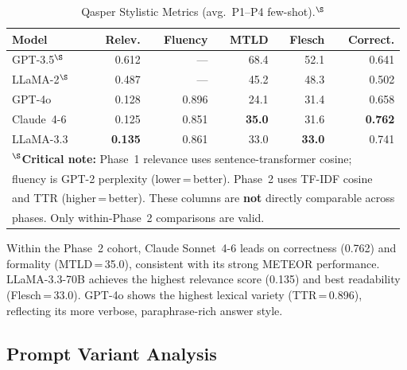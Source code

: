 \documentclass[sigconf,nonacm]{acmart}
\begin{document}
\begin{table}[t]
\caption{Qasper Stylistic Metrics (avg.\ P1--P4 few-shot).$^{\S}$}
\label{tab:qasper-style}
\centering\small
\setlength{\tabcolsep}{3.5pt}
\begin{tabular}{lrrrrr}
\toprule
\textbf{Model} & \textbf{Relev.}
  & \textbf{Fluency} & \textbf{MTLD} & \textbf{Flesch} & \textbf{Correct.} \\
\midrule
GPT-3.5$^{\S}$ & 0.612 & --- & 68.4 & 52.1 & 0.641 \\
LLaMA-2$^{\S}$ & 0.487 & --- & 45.2 & 48.3 & 0.502 \\
\midrule
GPT-4o      & 0.128 & 0.896 & 24.1 & 31.4 & 0.658 \\
Claude~4-6  & 0.125 & 0.851 & \textbf{35.0} & 31.6 & \textbf{0.762} \\
LLaMA-3.3   & \textbf{0.135} & 0.861 & 33.0 & \textbf{33.0} & 0.741 \\
\bottomrule
\multicolumn{6}{l}{\footnotesize $^{\S}$\textbf{Critical note:} Phase~1
  relevance uses sentence-transformer cosine;}\\
\multicolumn{6}{l}{\footnotesize fluency is GPT-2 perplexity (lower\,=\,better).
  Phase~2 uses TF-IDF cosine}\\
\multicolumn{6}{l}{\footnotesize and TTR (higher\,=\,better). These columns
  are \textbf{not} directly comparable across}\\
\multicolumn{6}{l}{\footnotesize phases. Only within-Phase~2 comparisons are valid.}\\
\end{tabular}
\end{table}

Within the Phase~2 cohort, Claude Sonnet~4-6 leads on correctness (0.762)
and formality (MTLD\,=\,35.0), consistent with its strong METEOR performance.
LLaMA-3.3-70B achieves the highest relevance score (0.135) and best
readability (Flesch\,=\,33.0).
GPT-4o shows the highest lexical variety (TTR\,=\,0.896), reflecting
its more verbose, paraphrase-rich answer style.

\subsection{Prompt Variant Analysis}
\label{sec:results:prompts}
\end{document}
